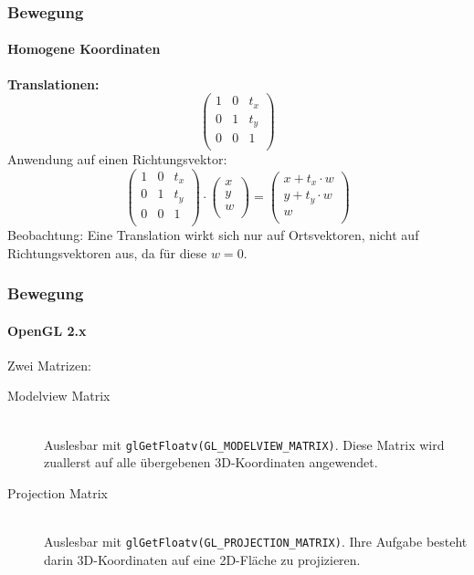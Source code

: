 \documentclass[dvips,12pt,xcolor=table]{beamer}
\begin{document}
\begin{frame}
\frametitle{Bewegung}
\framesubtitle{Homogene Koordinaten}
\textbf{Translationen: \\}
\begin{equation}
 \left(\begin{array}{ccc}
  1 & 0 & t_{x} \\
  0 & 1 & t_{y} \\
  0 & 0 & 1 \\
 \end{array}\right)
\end{equation}
Anwendung auf einen Richtungsvektor:
\begin{equation}
 \left(\begin{array}{ccc}
  1 & 0 & t_{x} \\
  0 & 1 & t_{y} \\
  0 & 0 & 1 \\
 \end{array}\right)
 \cdot
 \left(\begin{array}{ccc}
  x \\
  y \\
  w \\
 \end{array}\right)
 =
 \left(\begin{array}{ccc}
  x + t_{x} \cdot w \\
  y + t_{y} \cdot w \\
  w \\
 \end{array}\right)
\end{equation}
Beobachtung:
Eine Translation wirkt sich nur auf Ortsvektoren,
nicht auf Richtungsvektoren aus,
da für diese $w = 0$.
\end{frame}


\begin{frame}
\frametitle{Bewegung}
\framesubtitle{OpenGL 2.x}
Zwei Matrizen:
\begin{description}
 \item[Modelview Matrix] \hfill \\
  Auslesbar mit
  \texttt{glGetFloatv(GL\_MODELVIEW\_MATRIX)}.
  Diese Matrix wird zuallerst
  auf alle übergebenen 3D-Koordinaten angewendet.
 \item[Projection Matrix] \hfill \\
  Auslesbar mit
  \texttt{glGetFloatv(GL\_PROJECTION\_MATRIX)}.
  Ihre Aufgabe besteht darin 3D-Koordinaten
  auf eine 2D-Fläche zu projizieren.
\end{description}
\end{frame}
\end{document}
